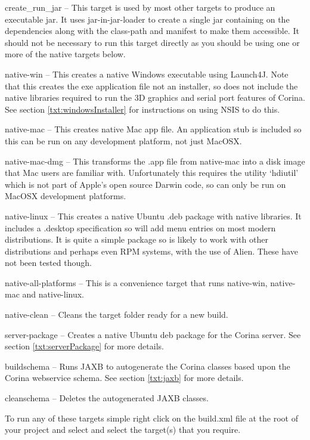 \begin{description*}
 \item[create\_run\_jar] -- This target is used by most other targets to produce an executable jar.  It uses jar-in-jar-loader to create a single jar containing on the dependencies along with the class-path and manifest to make them accessible.  It should not be necessary to run this target directly as you should be using one or more of the native targets below.
 \item[native-win] -- This creates a native Windows executable using Launch4J.  Note that this creates the exe application file not an installer, so does not include the native libraries required to run the 3D graphics and serial port features of Corina.  See section \ref{txt:windowsInstaller} for instructions on using NSIS to do this.
 \item[native-mac] -- This creates native Mac app file.  An application stub is included so this can be run on any development platform, not just MacOSX.
 \item[native-mac-dmg] -- This transforms the .app file from native-mac into a disk image that Mac users are familiar with.  Unfortunately this requires the utility `hdiutil' which is not part of Apple's open source Darwin code, so can only be run on MacOSX development platforms.
 \item[native-linux]  -- This creates a native Ubuntu .deb package with native libraries.  It includes a .desktop specification so will add menu entries on most modern distributions. It is quite a simple package so is likely to work with other distributions and perhaps even RPM systems, with the use of Alien.  These have not been tested though.
 \item[native-all-platforms] -- This is a convenience target that runs native-win, native-mac and native-linux.
 \item[native-clean] -- Cleans the target folder ready for a new build.
 \item[server-package] -- Creates a native Ubuntu deb package for the Corina server.  See section \ref{txt:serverPackage} for more details.
 \item[buildschema] -- Runs JAXB to autogenerate the Corina classes based upon the Corina webservice schema.  See section \ref{txt:jaxb} for more details. 
 \item[cleanschema] -- Deletes the autogenerated JAXB classes.
\end{description*}

To run any of these targets simple right click on the build.xml file at the root of your project and select  and select the target(s) that you require.

